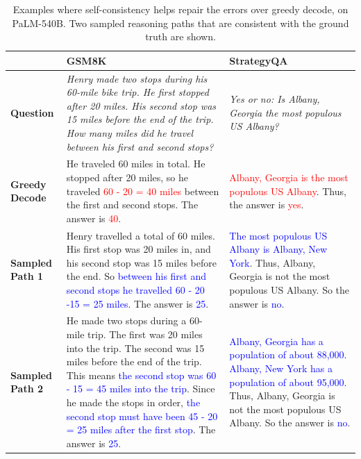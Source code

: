 \documentclass{article} %
\begin{document}
\begin{table}[h]
\vspace{-0.05in}
\setlength\tabcolsep{4pt}
\scriptsize
\centering
    \begin{tabu} to 1
        \toprule
        &GSM8K & StrategyQA\\
        \midrule
         \textbf{Question} & \textit{Henry made two stops during his 60-mile bike trip. He first stopped after 20 miles. His second stop was 15 miles before the end of the trip. How many miles did he travel between his first and second stops?} & \textit{Yes or no: Is Albany, Georgia the most populous US Albany?}\\
         \midrule
         \textbf{Greedy Decode} & He traveled 60 miles in total. He stopped after 20 miles, so he traveled \textcolor{red}{60 - 20 = 40 miles} between the first and second stops. The answer is \textcolor{red}{40}. & \textcolor{red}{Albany, Georgia is the most populous US Albany}. Thus, the answer is \textcolor{red}{yes}.\\
         \midrule
         \textbf{Sampled Path 1} & Henry travelled a total of 60 miles. His first stop was 20 miles in, and his second stop was 15 miles before the end. So \textcolor{blue}{between his first and second stops he travelled 60 - 20 -15 = 25 miles}. The answer is \textcolor{blue}{25}. & \textcolor{blue}{The most populous US Albany is Albany, New York}. Thus, Albany, Georgia is not the most populous US Albany. So the answer is \textcolor{blue}{no}.\\
         \midrule
         \textbf{Sampled Path 2} & He made two stops during a 60-mile trip. The first was 20 miles into the trip. The second was 15 miles before the end of the trip. This means \textcolor{blue}{the second stop was 60 - 15 = 45 miles into the trip}. Since he made the stops in order, \textcolor{blue}{the second stop must have been 45 - 20 = 25 miles after the first stop}. The answer is \textcolor{blue}{25}. & \textcolor{blue}{Albany, Georgia has a population of about 88,000. Albany, New York has a population of about 95,000}. Thus, Albany, Georgia is not the most populous US Albany. So the answer is \textcolor{blue}{no}.\\
         \bottomrule
    \end{tabu}
    \vspace{-0.15in}
    \caption{Examples where self-consistency helps repair the errors over greedy decode, on PaLM-540B. Two sampled reasoning paths that are consistent with the ground truth are shown.}
    \label{tab:example_path}
\end{table}
\end{document}
